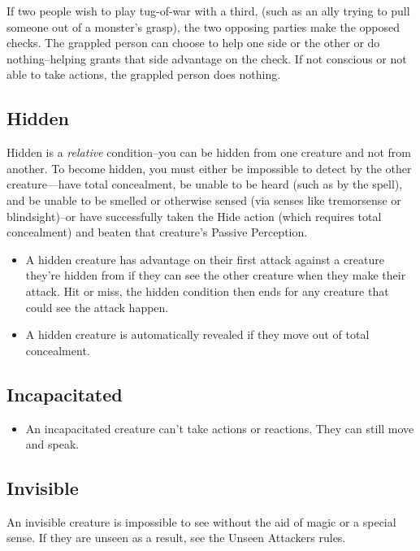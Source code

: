 If two people wish to play tug-of-war with a third, (such as an ally trying to pull someone out of a monster's grasp), the two opposing parties make the opposed checks. The grappled person can choose to help one side or the other or do nothing--helping grants that side advantage on the check. If not conscious or not able to take actions, the grappled person does nothing.

\subsection{Hidden}\label{condition:hidden}
Hidden is a \textit{relative} condition--you can be hidden from one creature and not from another. To become hidden, you must either be impossible to detect by the other creature---have total concealment, be unable to be heard (such as by the  spell), and be unable to be smelled or otherwise sensed (via senses like tremorsense or blindsight)--or have successfully taken the Hide action (which requires total concealment) and beaten that creature's Passive Perception.
\begin{itemize}
	\item A hidden creature has advantage on their first attack against a creature they're hidden from if they can see the other creature when they make their attack. Hit or miss, the hidden condition then ends for any creature that could see the attack happen.
	\item A hidden creature is automatically revealed if they move out of total concealment.
\end{itemize}

\subsection{Incapacitated\label{condition:incapacitated}}
\begin{itemize}
\item An incapacitated creature can't take actions or reactions. They can still move and speak.
\end{itemize}

\subsection{Invisible\label{condition:invisible}}
An invisible creature is impossible to see without the aid of magic or a special sense. If they are unseen as a result, see the Unseen Attackers rules. 


